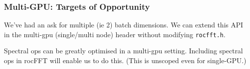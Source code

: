 \documentclass[10pt,aspectratio=169]{beamer}
\begin{document}
\begin{frame}
  \frametitle{Multi-GPU: Targets of Opportunity}

  We've had an ask for multiple (ie 2) batch dimensions.  We can
  extend this API in the multi-gpu (single/multi node) header without
  modifying \texttt{rocfft.h}.  

  \bigskip
  
  Spectral ops can be greatly optimised in a multi-gpu setting.
  Including spectral ops in rocFFT will enable us to do this.  (This
  is unscoped even for single-GPU.)

\end{frame}
\end{document}
